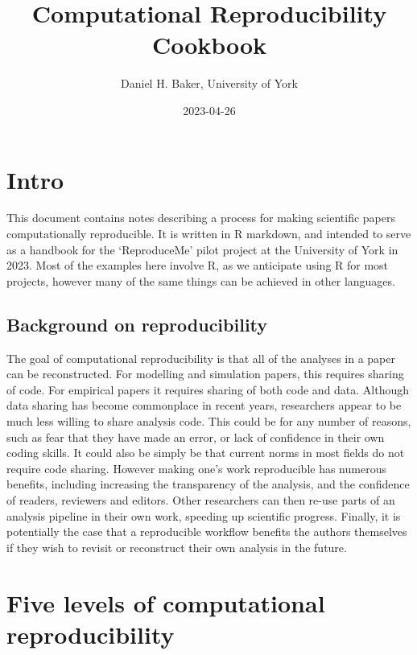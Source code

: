 \documentclass[
]{article}
\title{Computational Reproducibility Cookbook}
\author{Daniel H. Baker, University of York}
\date{2023-04-26}
\begin{document}
\maketitle

\hypertarget{intro}{%
\section{Intro}\label{intro}}

This document contains notes describing a process for making scientific papers computationally reproducible. It is written in R markdown, and intended to serve as a handbook for the `ReproduceMe' pilot project at the University of York in 2023. Most of the examples here involve R, as we anticipate using R for most projects, however many of the same things can be achieved in other languages.

\hypertarget{background-on-reproducibility}{%
\subsection{Background on reproducibility}\label{background-on-reproducibility}}

The goal of computational reproducibility is that all of the analyses in a paper can be reconstructed. For modelling and simulation papers, this requires sharing of code. For empirical papers it requires sharing of both code and data. Although data sharing has become commonplace in recent years, researchers appear to be much less willing to share analysis code. This could be for any number of reasons, such as fear that they have made an error, or lack of confidence in their own coding skills. It could also be simply be that current norms in most fields do not require code sharing. However making one's work reproducible has numerous benefits, including increasing the transparency of the analysis, and the confidence of readers, reviewers and editors. Other researchers can then re-use parts of an analysis pipeline in their own work, speeding up scientific progress. Finally, it is potentially the case that a reproducible workflow benefits the authors themselves if they wish to revisit or reconstruct their own analysis in the future.

\hypertarget{five-levels-of-computational-reproducibility}{%
\section{Five levels of computational reproducibility}\label{five-levels-of-computational-reproducibility}}
\end{document}
